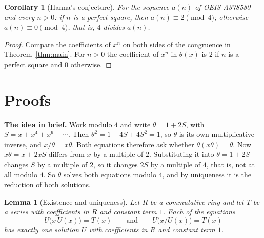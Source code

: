 \documentclass[11pt,a4paper]{article}
\newtheorem{lemma}[theorem]{Lemma}
\newtheorem{corollary}[theorem]{Corollary}
\theoremstyle{definition}
\theoremstyle{remark}
\newcommand{\para}[1]{\par\medskip\noindent\textbf{#1}\enspace}
\begin{document}
\begin{corollary}[Hanna's conjecture]\label{cor:conj}
For the sequence $a(n)$ of OEIS A378580 and every $n>0$: if $n$ is a perfect square, then $a(n)\equiv2\pmod4$;
otherwise $a(n)\equiv0\pmod4$, that is, $4$ divides $a(n)$.
\end{corollary}

\begin{proof}
Compare the coefficients of $x^n$ on both sides of the congruence in Theorem~\ref{thm:main}. For $n>0$ the coefficient
of $x^n$ in $\theta(x)$ is $2$ if $n$ is a perfect square and $0$ otherwise.
\end{proof}

\section{Proofs}\label{sec:proofs}

\para{The idea in brief.} Work modulo $4$ and write $\theta=1+2S$, with $S=x+x^4+x^9+\cdots$. Then
$\theta^2=1+4S+4S^2=1$, so $\theta$ is its own multiplicative inverse, and $x/\theta=x\theta$. Both equations therefore
ask whether $\theta(x\theta)=\theta$. Now $x\theta=x+2xS$ differs from $x$ by a multiple of $2$. Substituting it into
$\theta=1+2S$ changes $S$ by a multiple of $2$, so it changes $2S$ by a multiple of $4$, that is, not at all modulo $4$.
So $\theta$ solves both equations modulo $4$, and by uniqueness it is the reduction of both solutions.

\begin{lemma}[Existence and uniqueness]\label{lem:unique}
Let $R$ be a commutative ring and let $T$ be a series with coefficients in $R$ and constant term $1$. Each of the
equations
\[
U\bigl(x\,U(x)\bigr)=T(x)\qquad\text{and}\qquad U\bigl(x/U(x)\bigr)=T(x)
\]
has exactly one solution $U$ with coefficients in $R$ and constant term $1$.
\end{lemma}
\end{document}
